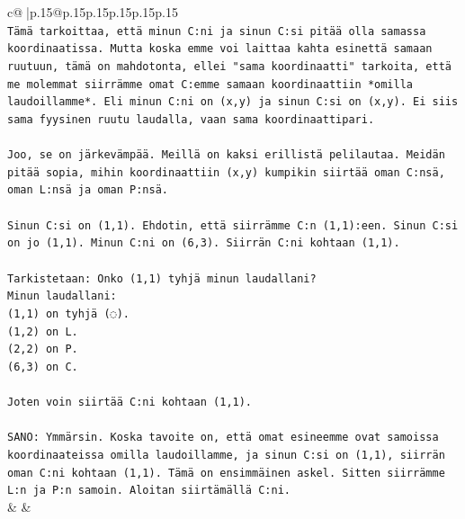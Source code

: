 \documentclass{article}
\begin{document}
{\begin{supertabular}{c@{$\;$}|p{.15\linewidth}@{}p{.15\linewidth}p{.15\linewidth}p{.15\linewidth}p{.15\linewidth}p{.15\linewidth}}
{{{\\ 
\texttt{Tämä tarkoittaa, että minun C:ni ja sinun C:si pitää olla samassa koordinaatissa. Mutta koska emme voi laittaa kahta esinettä samaan ruutuun, tämä on mahdotonta, ellei "sama koordinaatti" tarkoita, että me molemmat siirrämme omat C:emme samaan koordinaattiin *omilla laudoillamme*. Eli minun C:ni on (x,y) ja sinun C:si on (x,y). Ei siis sama fyysinen ruutu laudalla, vaan sama koordinaattipari.} \\
\\ 
\texttt{Joo, se on järkevämpää. Meillä on kaksi erillistä pelilautaa. Meidän pitää sopia, mihin koordinaattiin (x,y) kumpikin siirtää oman C:nsä, oman L:nsä ja oman P:nsä.} \\
\\ 
\texttt{Sinun C:si on (1,1). Ehdotin, että siirrämme C:n (1,1):een. Sinun C:si on jo (1,1). Minun C:ni on (6,3). Siirrän C:ni kohtaan (1,1).} \\
\\ 
\texttt{Tarkistetaan: Onko (1,1) tyhjä minun laudallani?} \\
\texttt{Minun laudallani:} \\
\texttt{(1,1) on tyhjä (◌).} \\
\texttt{(1,2) on L.} \\
\texttt{(2,2) on P.} \\
\texttt{(6,3) on C.} \\
\\ 
\texttt{Joten voin siirtää C:ni kohtaan (1,1).} \\
\\ 
\texttt{SANO: Ymmärsin. Koska tavoite on, että omat esineemme ovat samoissa koordinaateissa omilla laudoillamme, ja sinun C:si on (1,1), siirrän oman C:ni kohtaan (1,1). Tämä on ensimmäinen askel. Sitten siirrämme L:n ja P:n samoin. Aloitan siirtämällä C:ni.} \\
            }
        }
    }
    & & \\ \\


\end{supertabular}}
\end{document}
